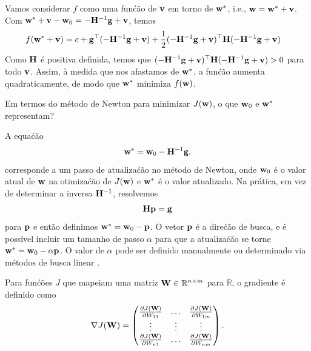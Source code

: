 \begin{exenumerate}
\begin{solution}
        Vamos considerar $f$ como uma fun\'c\~ao de $\mathbf{v}$ em torno de $\mathbf{w}^\ast$, i.e., $\mathbf{w} = \mathbf{w}^\ast+\mathbf{v}$. Com $\mathbf{w}^\ast+\mathbf{v}-\mathbf{w}_0= -\mathbf{H}^{-1}\mathbf{g} + \mathbf{v}$, temos
        \begin{align}
            f(\mathbf{w}^\ast+\mathbf{v}) & = c + \mathbf{g}^\top(- \mathbf{H}^{-1} \mathbf{g}+\mathbf{v}) + \frac{1}{2}(-\mathbf{H}^{-1}\mathbf{g} + \mathbf{v})^\top \mathbf{H} (-\mathbf{H}^{-1}\mathbf{g} + \mathbf{v})
        \end{align}
        Como $\mathbf{H}$ \'e positiva definida, temos que $(-\mathbf{H}^{-1}\mathbf{g} + \mathbf{v})^\top \mathbf{H}
        (-\mathbf{H}^{-1}\mathbf{g} + \mathbf{v})>0$ para todo $\mathbf{v}$. Assim, \`a medida que nos afastamos de $\mathbf{w}^\ast$,
        a fun\'c\~ao aumenta quadraticamente, de modo que $\mathbf{w}^\ast$ minimiza $f(\mathbf{w})$.
        
    \end{solution}
    
    
    \item Em termos do m\'etodo de Newton para minimizar $J(\mathbf{w})$, o que $\mathbf{w}_0$ e $\mathbf{w}^\ast$ representam?
    
    \begin{solution}
        A equa\'c\~ao
        \begin{equation}
            \mathbf{w}^\ast = \mathbf{w}_0 - \mathbf{H}^{-1} \mathbf{g}.
        \end{equation}
        corresponde a um passo de atualiza\'c\~ao no m\'etodo de Newton, onde $\mathbf{w}_0$ \'e o
        valor atual de $\mathbf{w}$ na otimiza\'c\~ao de $J(\mathbf{w})$ e $\mathbf{w}^\ast$ \'e o
        valor atualizado. Na pr\'atica, em vez de determinar a inversa $\mathbf{H}^{-1}$, resolvemos
        \begin{equation}
            \mathbf{H} \mathbf{p} = \mathbf{g}
        \end{equation}
        para $\mathbf{p}$ e ent\~ao definimos $\mathbf{w}^\ast = \mathbf{w}_0 - \mathbf{p}$. O vetor $\mathbf{p}$ \'e a
        dire\'c\~ao de busca, e \'e poss\'ivel incluir um tamanho de passo $\alpha$ para que
        a atualiza\'c\~ao se torne $\mathbf{w}^\ast = \mathbf{w}_0 - \alpha \mathbf{p}$. O valor de $\alpha$ pode
        ser definido manualmente ou determinado via m\'etodos de busca linear \citep[veja
        e.g.,][]{Nocedal1999}.
    \end{solution}
\end{exenumerate}


\label{ex:grad-matrix}
Para fun\'c\~oes $J$ que mapeiam uma matriz $\mathbf{W} \in \mathbb{R}^{n\times m}$ para $\mathbb{R}$, o gradiente \'e definido como 
\begin{equation}
    \nabla J(\mathbf{W}) = 
    \begin{pmatrix}
        \frac{\partial J(\mathbf{W})}{\partial W_{11}} & \ldots &  \frac{\partial J(\mathbf{W})}{\partial W_{1m}} \\
        \vdots & \vdots & \vdots\\
        \frac{\partial J(\mathbf{W})}{\partial W_{n1}} & \ldots &  \frac{\partial J(\mathbf{W})}{\partial W_{nm}}
    \end{pmatrix}.
\end{equation}

